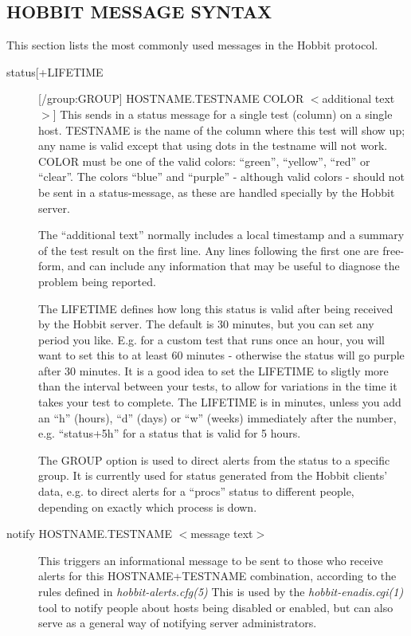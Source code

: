 \subsection{HOBBIT MESSAGE SYNTAX}


This section lists the most commonly used messages in the Hobbit protocol. 


\begin{description}

\item[status[+LIFETIME][/group:GROUP] HOSTNAME.TESTNAME COLOR
  $<$additional text$>$] This sends in a status message for a single
  test (column) on a single host. TESTNAME is the name of the column
  where this test will show up; any name is valid except that using
  dots in the testname will not work. COLOR must be one of the valid
  colors: ``green'', ``yellow'', ``red'' or ``clear''. The colors
  ``blue'' and ``purple'' - although valid colors - should not be sent
  in a status-message, as these are handled specially by the Hobbit
  server.  

The ``additional text'' normally includes a local timestamp and a
summary of the test result on the first line. Any lines following the
first one are free-form, and can include any information that may be
useful to diagnose the problem being reported.  

The LIFETIME defines how long this status is valid after being
received by the Hobbit server. The default is 30 minutes, but you can
set any period you like. E.g. for a custom test that runs once an
hour, you will want to set this to at least 60 minutes - otherwise the
status will go purple after 30 minutes. It is a good idea to set the
LIFETIME to sligtly more than the interval between your tests, to
allow for variations in the time it takes your test to complete. The
LIFETIME is in minutes, unless you add an ``h'' (hours), ``d'' (days)
or ``w'' (weeks) immediately after the number, e.g. ``status+5h'' for
a status that is valid for 5 hours.  


The GROUP option is used to direct alerts from the status to a
specific group. It is currently used for status generated from the
Hobbit clients' data, e.g. to direct alerts for a ``procs'' status to
different people, depending on exactly which process is down. 


 

\item[notify HOSTNAME.TESTNAME $<$message text$>$] This triggers an
 informational message to be sent to those who receive alerts for this
 HOSTNAME+TESTNAME combination, according to the rules defined in
 \emph{hobbit-alerts.cfg(5)}  This is used by the
 \emph{hobbit-enadis.cgi(1)} tool to notify people about hosts being
 disabled or enabled, but can also serve as a general way of notifying
 server administrators. 



\end{description}
